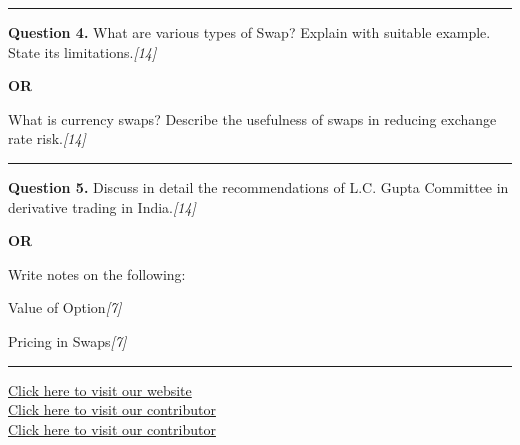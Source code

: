 \documentclass[11pt,a4paper]{article}
\newcommand{\pts}[1]{\hfill   \textit{[#1]}}
\begin{document}
\medskip\rule{\linewidth}{0.2pt}




\noindent   \textbf{Question 4.}
What are various types of Swap? Explain with suitable example. State its limitations.\pts{14}

\centerline{   \textbf{OR}}

What is currency swaps? Describe the usefulness of swaps in reducing exchange rate risk.\pts{14}

\medskip\rule{\linewidth}{0.2pt}




\noindent   \textbf{Question 5.}
Discuss in detail the recommendations of L.C. Gupta Committee in derivative trading in India.\pts{14}

\centerline{   \textbf{OR}}

Write notes on the following:

\begin{parts}
  \item Value of Option\pts{7}
  \item Pricing in Swaps\pts{7}
\end{parts}

\vfill
\rule{\linewidth}{0.4pt}

\begin{center}\small
\href{https://bhu-exam.vercel.app/}{Click here to visit our website}\\[4pt]
\href{https://me-aryan.vercel.app/}{Click here to visit our contributor}\\[4pt]
\href{https://quashan-me.vercel.app/}{Click here to visit our contributor}
\end{center}
\end{document}
